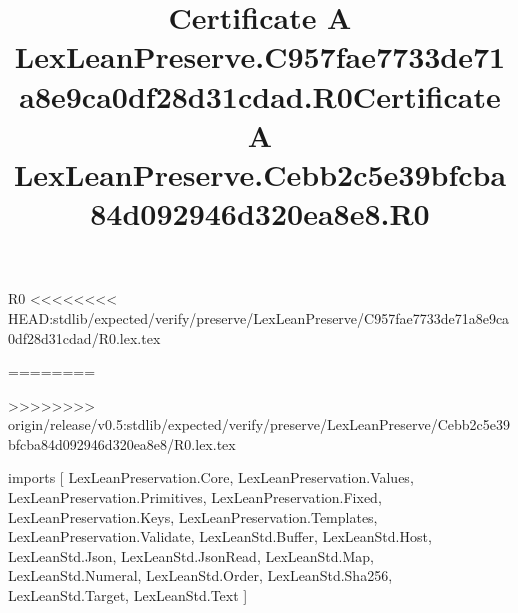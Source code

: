 \begin{lexlean}{R0}
<<<<<<<< HEAD:stdlib/expected/verify/preserve/LexLeanPreserve/C957fae7733de71a8e9ca0df28d31cdad/R0.lex.tex
\title{Certificate A LexLeanPreserve.C957fae7733de71a8e9ca0df28d31cdad.R0}
========
\title{Certificate A LexLeanPreserve.Cebb2c5e39bfcba84d092946d320ea8e8.R0}
>>>>>>>> origin/release/v0.5:stdlib/expected/verify/preserve/LexLeanPreserve/Cebb2c5e39bfcba84d092946d320ea8e8/R0.lex.tex
\begin{coremodule}
imports [
  LexLeanPreservation.Core,
  LexLeanPreservation.Values,
  LexLeanPreservation.Primitives,
  LexLeanPreservation.Fixed,
  LexLeanPreservation.Keys,
  LexLeanPreservation.Templates,
  LexLeanPreservation.Validate,
  LexLeanStd.Buffer,
  LexLeanStd.Host,
  LexLeanStd.Json,
  LexLeanStd.JsonRead,
  LexLeanStd.Map,
  LexLeanStd.Numeral,
  LexLeanStd.Order,
  LexLeanStd.Sha256,
  LexLeanStd.Target,
  LexLeanStd.Text
]


\end{coremodule}
\end{lexlean}
